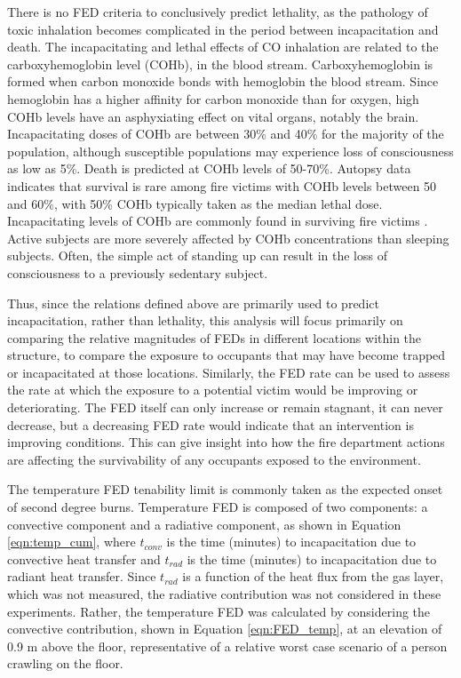 \documentclass[12pt,oneside]{article}
\begin{document}
There is no FED criteria to conclusively predict lethality, as the pathology of toxic inhalation becomes complicated in the period between incapacitation and death. The incapacitating and lethal effects of CO inhalation are related to the carboxyhemoglobin level (COHb), in the blood stream. Carboxyhemoglobin is formed when carbon monoxide bonds with hemoglobin the blood stream. Since hemoglobin has a higher affinity for carbon monoxide than for oxygen, high COHb levels have an asphyxiating effect on vital organs, notably the brain. Incapacitating doses of COHb are between 30\% and 40\% for the majority of the population, although susceptible populations may experience loss of consciousness as low as 5\%. Death is predicted at COHb levels of 50-70\%. Autopsy data indicates that survival is rare among fire victims with COHb levels between 50 and 60\%, with 50\% COHb typically taken as the median lethal dose. Incapacitating levels of COHb are commonly found in surviving fire victims \cite{SFPE:Purser}. Active subjects are more severely affected by COHb concentrations than sleeping subjects. Often, the simple act of standing up can result in the loss of consciousness to a previously sedentary subject. 

Thus, since the relations defined above are primarily used to predict incapacitation, rather than lethality, this analysis will focus primarily on comparing the relative magnitudes of FEDs in different locations within the structure, to compare the exposure to occupants that may have become trapped or incapacitated at those locations. Similarly, the FED rate can be used to assess the rate at which the exposure to a potential victim would be improving or deteriorating. The FED itself can only increase or remain stagnant, it can never decrease, but a decreasing FED rate would indicate that an intervention is improving conditions. This can give insight into how the fire department actions are affecting the survivability of any occupants exposed to the environment.

The temperature FED tenability limit is commonly taken as the expected onset of second degree burns. Temperature FED is composed of two components: a convective component and a radiative component, as shown in Equation \ref{eqn:temp_cum}, where $t_{conv}$ is the time (minutes) to incapacitation due to convective heat transfer and $t_{rad}$ is the time (minutes) to incapacitation due to radiant heat transfer. Since $t_{rad}$ is a function of the heat flux from the gas layer, which was not measured, the radiative contribution was not considered in these experiments. Rather, the temperature FED was calculated by considering the convective contribution, shown in Equation \ref{eqn:FED_temp}, at an elevation of 0.9 m above the floor, representative of a relative worst case scenario of a person crawling on the floor. 
\end{document}
